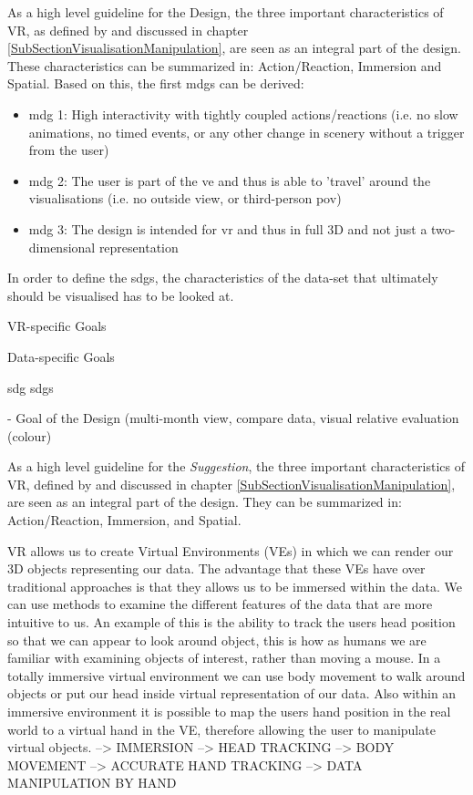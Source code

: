As a high level guideline for the Design, the three important characteristics of VR, as defined by \cite{Stone1994} and discussed in chapter \ref{SubSectionVisualisationManipulation}, are seen as an integral part of the design. These characteristics can be summarized in: Action/Reaction, Immersion and Spatial. Based on this, the first \glspl{mdg} can be derived:
\begin{itemize}[noitemsep,nolistsep]
	\item \gls{mdg} 1: High interactivity with tightly coupled actions/reactions (i.e. no slow animations, no timed events, or any other change in scenery without a trigger from the user)
	\item \gls{mdg} 2: The user is part of the \gls{ve} and thus is able to 'travel' around the visualisations (i.e. no outside view, or third-person \gls{pov})
	\item \gls{mdg} 3: The design is intended for \gls{vr} and thus in full 3D and not just a two-dimensional representation
\end{itemize}

In order to define the \glspl{sdg}, the characteristics of the data-set that ultimately should be visualised has to be looked at.


VR-specific Goals

Data-specific Goals




\gls{sdg}
\glspl{sdg}



- Goal of the Design (multi-month view, compare data, visual relative evaluation (colour)

As a high level guideline for the \textit{Suggestion}, the three important characteristics of VR, defined by \cite{Stone1994} and discussed in chapter \ref{SubSectionVisualisationManipulation}, are seen as an integral part of the design. They can be summarized in: Action/Reaction, Immersion, and Spatial. \newline




VR allows us to create Virtual Environments (VEs) in which we can render our 3D objects representing our data. The advantage that these VEs have over traditional approaches is that they allows us to be immersed within the data. We can use methods to examine the different features of the data that are more intuitive to us. An example of this is the ability to track the users head position so that we can appear to look around object, this is how as humans we are familiar with examining objects of interest, rather than moving a mouse. In a totally immersive virtual environment we can use body movement to walk around objects or put our head inside virtual representation of our data. Also within an immersive environment it is possible to map the users hand position in the real world to a virtual hand in the VE, therefore allowing the user to manipulate virtual objects.
\cite{Jamieson2007}
--> IMMERSION
--> HEAD TRACKING
--> BODY MOVEMENT
--> ACCURATE HAND TRACKING
--> DATA MANIPULATION BY HAND




